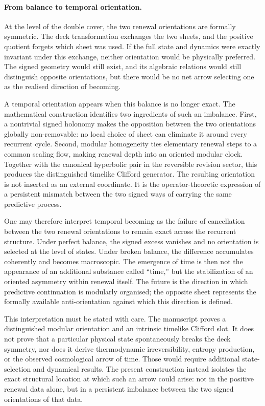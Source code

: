 \documentclass[11pt]{article}
\theoremstyle{definition}
\theoremstyle{remark}
\begin{document}
\paragraph{From balance to temporal orientation.}
At the level of the double cover, the two renewal orientations are formally
symmetric.  The deck transformation exchanges the two sheets, and the
positive quotient forgets which sheet was used.  If the full state and
dynamics were exactly invariant under this exchange, neither orientation
would be physically preferred.  The signed geometry would still exist, and
its algebraic relations would still distinguish opposite orientations, but
there would be no net arrow selecting one as the realised direction of
becoming.

A temporal orientation appears when this balance is no longer exact.  The
mathematical construction identifies two ingredients of such an imbalance.
First, a nontrivial signed holonomy makes the opposition between the two
orientations globally non-removable: no local choice of sheet can eliminate
it around every recurrent cycle.  Second, modular homogeneity ties elementary
renewal steps to a common scaling flow, making renewal depth into an oriented
modular clock.  Together with the canonical hyperbolic pair in the reversible
revision sector, this produces the distinguished timelike Clifford generator.
The resulting orientation is not inserted as an external coordinate.  It is
the operator-theoretic expression of a persistent mismatch between the two
signed ways of carrying the same predictive process.

One may therefore interpret temporal becoming as the failure of
cancellation between the two renewal orientations to remain exact across the
recurrent
structure.  Under perfect balance, the signed excess vanishes and no
orientation is selected at the level of states.  Under broken balance, the
difference accumulates coherently and becomes macroscopic.  The emergence of
time is then not the appearance of an additional substance called ``time,''
but the stabilization of an oriented asymmetry within renewal itself.  The
future is the direction in which predictive continuation is modularly
organised; the opposite sheet represents the formally available
anti-orientation against which this direction is defined.

This interpretation must be stated with care.  The manuscript proves a
distinguished modular orientation and an intrinsic timelike Clifford slot.  It
does not prove that a particular physical state spontaneously breaks the deck
symmetry, nor does it derive thermodynamic irreversibility, entropy production,
or the observed cosmological arrow of time.  Those would require additional
state-selection and dynamical results.  The present construction instead
isolates the exact structural location at which such an arrow could arise:
not in the positive renewal data alone, but in a persistent imbalance between
the two signed orientations of that data.
\end{document}
